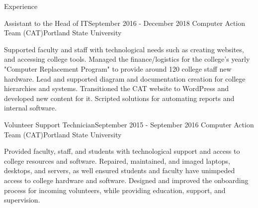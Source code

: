 \documentclass{resume} %
\begin{document}
\begin{rSection}{Experience}

\begin{sSubsection} 
    {Assistant to the Head of IT}{September 2016 - December 2018}
    {Computer Action Team (CAT)}{Portland State University}

Supported faculty and staff with technological needs such as creating websites, and accessing college tools. Managed the finance/logistics for the college's yearly "Computer Replacement Program" to provide around 120 college staff new hardware. Lead and supported diagram and documentation creation for college hierarchies and systems. Transitioned the CAT website to WordPress and developed new content for it. Scripted solutions for automating reports and internal software.

\end{sSubsection}

\vspace{2mm}

\begin{sSubsection}
    {Volunteer Support Technician}{September 2015 - September 2016}
    {Computer Action Team (CAT)}{Portland State University}

Provided faculty, staff, and students with technological support and access to college resources and software. Repaired, maintained, and imaged laptops, desktops, and servers, as well ensured students and faculty have unimpeded access to college hardware and software. Designed and improved the onboarding process for incoming volunteers, while providing education, support, and supervision.

\end{sSubsection}

\end{rSection}

\end{document}
